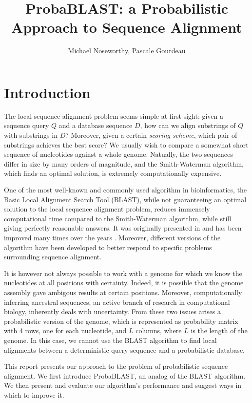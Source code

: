 \documentclass[12pt]{IEEEtran}
\begin{document}
\title{ProbaBLAST: a Probabilistic Approach to Sequence Alignment}
\author{Michael Noseworthy, Pascale Gourdeau}
\date{}
\maketitle

\section{Introduction}

The local sequence alignment problem seems simple at first sight: given a sequence query $Q$ and a database sequence $D$, how can we align substrings of $Q$ with substrings in $D$? Moreover, given a certain \emph{scoring scheme}, which pair of substrings achieves the best score? We usually wish to compare a somewhat short sequence of nucleotides against a whole genome. Natually, the two sequences differ in size by many orders of magnitude, and the Smith-Waterman algorithm, which finds an optimal solution, is extremely computationally expensive. 

One of the most well-known and commonly used algorithm in bioinformatics, the Basic Local Alignment Search Tool (BLAST), while not guaranteeing an optimal solution to the local sequence alignment problem, reduces immensely computational time compared to the Smith-Waterman algorithm, while still giving perfectly reasonable answers. It was originally presented in \cite{originalBLAST} and has been improved many times over the years \cite{blast2}. Moreover, different versions of the algorithm have been developed to better respond to specific problems surrounding sequence alignment. 

It is however not always possible to work with a genome for which we know the nucleotides at all positions with certainty. Indeed, it is possible that the genome assembly gave ambigous results at certain positions. Moreover, computationally inferring ancestral sequences, an active branch of research in computational biology, inherently deals with uncertainty. From these two issues arises a probabilistic version of the genome, which is represented as probability matrix with 4 rows, one for each nucleotide, and $L$ columns, where $L$ is the length of the genome. In this case, we cannot use the BLAST algorithm to find local alignments between a deterministic query sequence and a probabilistic database.

This report presents our approach to the problem of probabilistic sequence alignment. 
We first introduce ProbaBLAST, an analog of the BLAST algorithm. We then present and evaluate our algorithm's performance and suggest ways in which to improve it.
\end{document}
